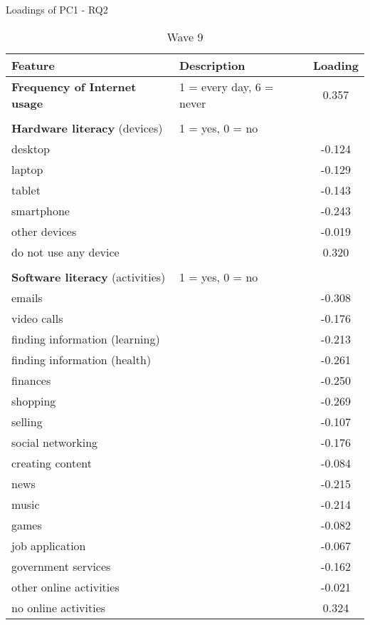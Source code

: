 \documentclass[12pt]{article}
\begin{document}
    \begin{table}[h!]
        \centering
        \caption{Loadings of PC1 - RQ2}
        \label{tab:pc1_loadings_rq2}

        \begin{subtable}{\textwidth}
            \centering
            \caption{Wave 9}
            \begin{tabular}{llc}
                \toprule
                Feature & Description & Loading \\
                \midrule
                \textbf{Frequency of Internet usage} & 1 = every day, 6 = never & 0.357 \\
                & & \\
                \textbf{Hardware literacy} (devices) & 1 = yes, 0 = no & \\
                desktop &  & -0.124 \\
                laptop &  & -0.129 \\
                tablet &  & -0.143 \\
                smartphone &  & -0.243 \\
                other devices &  & -0.019 \\
                do not use any device &  & 0.320 \\
                & & \\
                \textbf{Software literacy} (activities) & 1 = yes, 0 = no & \\
                emails &  & -0.308 \\
                video calls &  & -0.176 \\
                finding information (learning) &  & -0.213 \\
                finding information (health) &  & -0.261 \\
                finances &  & -0.250 \\
                shopping &  & -0.269 \\
                selling &  & -0.107 \\
                social networking &  & -0.176 \\
                creating content &  & -0.084 \\
                news &  & -0.215 \\
                music &  & -0.214 \\
                games &  & -0.082 \\
                job application &  & -0.067 \\
                government services &  & -0.162 \\
                other online activities &  & -0.021 \\
                no online activities &  & 0.324 \\
                \bottomrule
            \end{tabular}
        \end{subtable}


\end{table}
\end{document}
